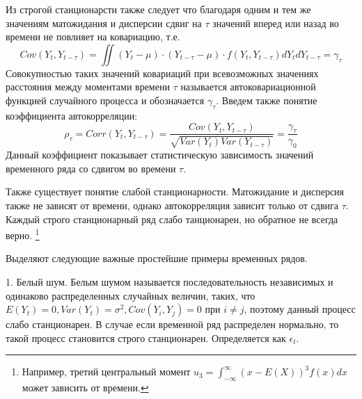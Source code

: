 \documentclass[12pt, a4paper]{article} %
\begin{document}
Из строгой станционарсти также следует что благодаря одним и тем же значениям матожидания и дисперсии сдвиг на $\tau$ значений вперед или назад во времени не повлияет на ковариацию, т.е.
\begin{equation}
   Cov(Y_t, Y_{t-\tau})=\iint(Y_t-\mu)\cdot(Y_{t-\tau}-\mu)\cdot f(Y_t, Y_{t-\tau})dY_tdY_{t-\tau} = \gamma_{\tau}
\end{equation}
Совокупностью таких значений ковариаций при всевозможных значениях расстояния между моментами времени $\tau$ называется автоковариационной функцией случайного процесса и обозначается $\gamma_\tau$. Введем также понятие коэффициента автокорреляции:
\begin{equation}
    \rho_\tau=Corr(Y_t, Y_{t-\tau})= \frac{Cov(Y_t, Y_{t-\tau})}{\sqrt{Var(Y_t)Var(Y_{t-\tau})}} = \frac{\gamma_\tau}{\gamma_0}
\end{equation}
Данный коэффициент показывает статистическую зависимость значений временного ряда со сдвигом во времени $\tau$.

Также существует понятие слабой станционарности. Матожидание и дисперсия также не зависят от времени, однако автокорреляция зависит только от сдвига $\tau$. Каждый строго станционарный ряд слабо танционарен, но обратное не всегда верно. \footnote{Например, третий центральный момент $u_3=\int_{-\infty}^{\infty}(x-E(X))^3f(x)dx$ может зависить от времени.}

Выделяют следующие важные простейшие примеры временных рядов.

1. Белый шум. Белым шумом называется последовательность независимых и одинаково распределенных случайных величин, таких, что $E(Y_t)=0, Var(Y_t)=\sigma^2, Cov(Y_i, Y_j)=0$ при $i \neq j$, поэтому данный процесс слабо станционарен. В случае если временной ряд распределен нормально, то такой процесс становится строго станционарен. Определяется как $\epsilon_t$.
\end{document}
